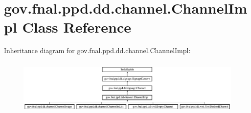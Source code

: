 \hypertarget{classgov_1_1fnal_1_1ppd_1_1dd_1_1channel_1_1ChannelImpl}{\section{gov.\-fnal.\-ppd.\-dd.\-channel.\-Channel\-Impl Class Reference}
\label{classgov_1_1fnal_1_1ppd_1_1dd_1_1channel_1_1ChannelImpl}
}
Inheritance diagram for gov.\-fnal.\-ppd.\-dd.\-channel.\-Channel\-Impl\-:\begin{figure}[H]
\begin{center}
\leavevmode
\includegraphics[height=2.800000cm]{classgov_1_1fnal_1_1ppd_1_1dd_1_1channel_1_1ChannelImpl}
\end{center}
\end{figure}
